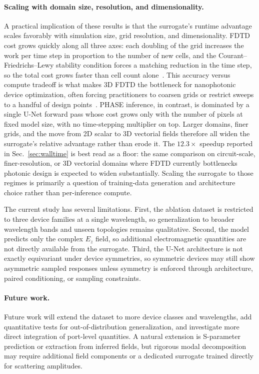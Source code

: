 \documentclass[%
 reprint,
 amsmath,amssymb,
 aps,
floatfix,
]{revtex4-2}
\begin{document}
\paragraph{Scaling with domain size, resolution, and dimensionality.}
A practical implication of these results is that the surrogate's runtime advantage scales favorably with simulation size, grid resolution, and dimensionality. FDTD cost grows quickly along all three axes: each doubling of the grid increases the work per time step in proportion to the number of new cells, and the Courant--Friedrichs--Lewy stability condition forces a matching reduction in the time step, so the total cost grows faster than cell count alone~\cite{TafloveHagness2005FDTD}. This accuracy versus compute tradeoff is what makes 3D FDTD the bottleneck for nanophotonic device optimization, often forcing practitioners to coarsen grids or restrict sweeps to a handful of design points~\cite{BurrFarjadpour2005FDTDAccuracy}. PHASE inference, in contrast, is dominated by a single U-Net forward pass whose cost grows only with the number of pixels at fixed model size, with no time-stepping multiplier on top. Larger domains, finer grids, and the move from 2D scalar to 3D vectorial fields therefore all widen the surrogate's relative advantage rather than erode it. The $12.3\times$ speedup reported in Sec.~\ref{sec:walltime} is best read as a floor: the same comparison on circuit-scale, finer-resolution, or 3D vectorial domains where FDTD currently bottlenecks photonic design is expected to widen substantially. Scaling the surrogate to those regimes is primarily a question of training-data generation and architecture choice rather than per-inference compute.

The current study has several limitations. First, the ablation dataset is restricted to three device families at a single wavelength, so generalization to broader wavelength bands and unseen topologies remains qualitative. Second, the model predicts only the complex $E_z$ field, so additional electromagnetic quantities are not directly available from the surrogate. Third, the U-Net architecture is not exactly equivariant under device symmetries, so symmetric devices may still show asymmetric sampled responses unless symmetry is enforced through architecture, paired conditioning, or sampling constraints.

\paragraph{Future work.}
Future work will extend the dataset to more device classes and wavelengths, add quantitative tests for out-of-distribution generalization, and investigate more direct integration of port-level quantities. A natural extension is S-parameter prediction or extraction from inferred fields, but rigorous modal decomposition may require additional field components or a dedicated surrogate trained directly for scattering amplitudes.
\end{document}
